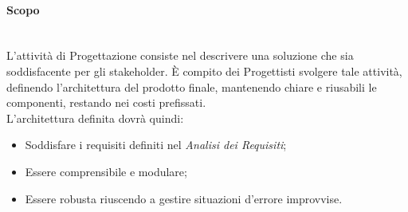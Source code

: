 \paragraph{Scopo}
\label{Progettazione_Scopo} \-\\
L'attività di Progettazione consiste nel descrivere una soluzione che sia soddisfacente per gli stakeholder\glossario. È compito dei Progettisti svolgere tale attività, definendo l'architettura del prodotto finale, mantenendo chiare e riusabili le componenti, restando nei costi prefissati.\\
L'architettura definita dovrà quindi:
\begin{itemize}
	\item Soddisfare i requisiti definiti nel \textit{Analisi dei Requisiti};
	\item Essere comprensibile e modulare;
	\item Essere robusta riuscendo a gestire situazioni d'errore improvvise.
\end{itemize}

